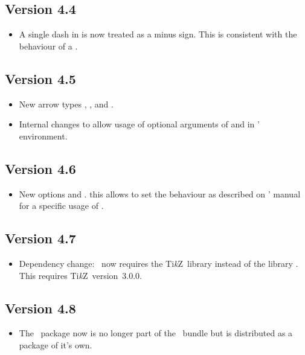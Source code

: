 \documentclass[load-preamble+]{cnltx-doc}
\newcommand*\TikZ{Ti\textit{k}Z}
\begin{document}
\subsection{Version 4.4}
\begin{itemize}
  \item A single dash \code{-} in  is now treated as a minus sign.
  This is consistent with the behaviour of a \code{+}.
\end{itemize}

\subsection{Version 4.5}
\begin{itemize}
  \item New arrow types \arrowtype{>=<}, \arrowtype{>=<<}, \arrowtype{>>=<}
    and \arrowtype{<==>}.
  \item Internal changes to  allow usage of optional arguments of
    \cs*{\textbackslash} and  in \chemmacros' 
    environment.
\end{itemize}

\subsection{Version 4.6}
\begin{itemize}
  \item New options  and .  this allows to
    set the behaviour as described on \chemmacros' manual for a specific usage
    of .
\end{itemize}

\subsection{Version 4.7}
\begin{itemize}
  \item Dependency change: \chemformula\ now requires the \TikZ\ library
     instead of the library .  This requires
    \TikZ\ version~3.0.0.
\end{itemize}

\subsection{Version 4.8}
\begin{itemize}
  \item The \chemformula\ package now is no longer part of the \chemmacros\
    bundle but is distributed as a package of it's own.
\end{itemize}
\end{document}
